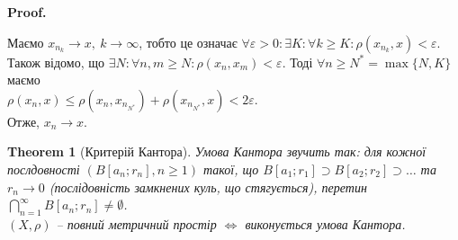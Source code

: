 \documentclass[a4paper, 10pt]{article}
\makeatletter
\theoremstyle{theoremdd}
\newtheorem{theorem}{Theorem}[subsection]
\theoremstyle{theoremdd}
\theoremstyle{theoremdd}
\theoremstyle{theoremdd}
\theoremstyle{theoremdd}
\theoremstyle{theoremdd}
\theoremstyle{theoremdd}
\theoremstyle{theoremdd}
\renewenvironment{proof}[1][Proof.\\]{\par
\pushQED{\hfill \qed}%
\normalfont \topsep6\p@\@plus6\p@\relax
\trivlist
\item\relax
{\bfseries
#1\@addpunct{.}}\hspace\labelsep\ignorespaces
}{%
\popQED\endtrivlist\@endpefalse
}
\makeatother
\begin{document}
\begin{proof}
Маємо $x_{n_k} \to x,\ k \to \infty$, тобто це означає $\forall \varepsilon > 0: \exists K: \forall k \geq K: \rho(x_{n_k}, x) < \varepsilon$.\\
Також відомо, що  $\exists N: \forall n,m \geq N: \rho(x_n,x_m) < \varepsilon$. Тоді $\forall n \geq N^* = \max\{N,K\}$ маємо\\
$\rho(x_n,x) \leq \rho(x_n,x_{n_{N^*}}) + \rho(x_{n_{N^*}},x) < 2\varepsilon$.\\
Отже, $x_n \to x$.
\end{proof}

\begin{theorem}[Критерій Кантора]
Умова Кантора звучить так: для кожної послдовності $(B[a_n;r_n], n \geq 1)$ такої, що $B[a_1;r_1] \supset B[a_2;r_2] \supset \dots$ та $r_n \to 0$ (послідовність замкнених куль, що стягується), перетин $\displaystyle\bigcap_{n=1}^\infty B[a_n;r_n] \neq \emptyset$.\\
$(X,\rho)$ -- повний метричний простір $\iff$ виконується умова Кантора.
\end{theorem}
\end{document}
